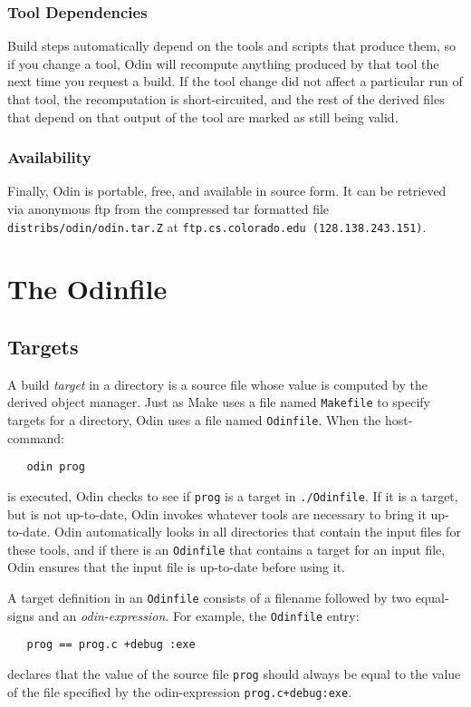 \documentclass[hidelinks]{report}
\newcommand{\ex}{\tt}   %
\begin{document}
\subsection{Tool Dependencies}
Build steps automatically depend on the tools and scripts that produce them,
so if you change a tool, Odin will recompute anything produced by that
tool the next time you request a build.
If the tool change did not affect a particular run of that tool,
the recomputation is short-circuited,
and the rest of the derived files 
that depend on that output of the tool are marked as still being valid.

\subsection{Availability}
Finally, Odin is portable, free, and available in source form.
It can be retrieved via anonymous ftp
from the compressed tar formatted file {\ex distribs/odin/odin.tar.Z}
at {\ex ftp.cs.colorado.edu (128.138.243.151)}.


\chapter{The Odinfile}
\label{odinfile}


\section{Targets}
\label{target}

A build {\em target} in a directory is
a source file whose value is computed by the derived object manager.
Just as Make uses a file named {\ex Makefile} to specify targets
for a directory, Odin uses a file named {\ex Odinfile}.
When the host-command:
\begin{verbatim}
   odin prog
\end{verbatim}
is executed, Odin checks to see if {\ex prog} is a target
in {\ex ./Odinfile}.
If it is a target, but is not up-to-date,
Odin invokes whatever tools are necessary to bring it up-to-date.
Odin automatically looks in all directories that
contain the input files for these tools,
and if there is an {\ex Odinfile}
that contains a target for an input file,
Odin ensures that the input file is up-to-date before using it.

A target definition in an {\ex Odinfile} consists of a filename
followed by two equal-signs and an {\em odin-expression}.
For example, the {\ex Odinfile} entry:
\begin{verbatim}
   prog == prog.c +debug :exe
\end{verbatim}
declares that the value of the source file {\ex prog}
should always be equal to the value
of the file specified by the odin-expression {\ex prog.c+debug:exe}.
\end{document}
